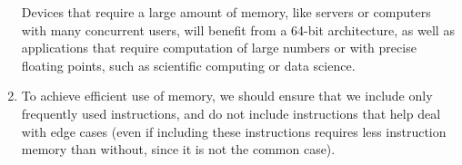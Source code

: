 \begin{enumerate}[label=(\alph*)]
    Devices that require a large amount of memory, like servers or computers with many concurrent users, will benefit from a 64-bit architecture, as well as applications that require computation of large numbers or with precise floating points, such as scientific computing or data science.

  \item
    To achieve efficient use of memory, we should ensure that we include only frequently used instructions, and do not include instructions that help deal with edge cases (even if including these instructions requires less instruction memory than without, since it is not the common case).
    
        
\end{enumerate}

